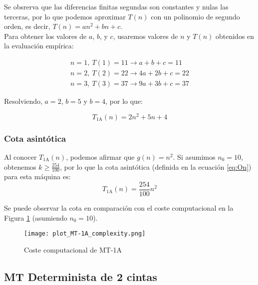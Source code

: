 Se obsrerva que las diferencias finitas segundas son constantes y nulas las terceras, por lo que podemos aproximar $T(n)$ con un polinomio de segundo orden, es decir, $T(n) = an^2 + bn + c$.\\

Para obtener los valores de $a$, $b$, y $c$, usaremos valores de $n$ y $T(n)$ obtenidos en la evaluación empírica:

\begin{subequations}
    \begin{gather}
        n = 1,\ T(1) = 11 \rightarrow a + b + c = 11 \\
        n = 2,\ T(2) = 22 \rightarrow 4a + 2b + c = 22 \\
        n = 3,\ T(3) = 37 \rightarrow 9a + 3b + c = 37
    \end{gather}
\end{subequations}

Resolviendo, $a=2$, $b=5$ y $b=4$, por lo que:

\begin{equation}
    T_{\mathrm{1A}}(n) = 2n^2 + 5n + 4
\end{equation}

\subsubsection*{Cota asintótica}
Al conocer $T_{\mathrm{1A}}(n)$, podemos afirmar que $g(n) = n^2$. Si asumimos $n_0 = 10$, obtenemos $k \geq \frac{254}{100}$, por lo que la cota asintótica (definida en la ecuación \ref{eq:On}) para esta máquina es:
\begin{equation}
    T_{\mathrm{1A}}(n) = \frac{254}{100} n^2
\end{equation}


Se puede observar la cota en comparación con el coste computacional en la Figura \ref{fig:MT-1A_plot} (asumiendo $n_0 = 10$).

\begin{figure}[h]
    \centering
    \texttt{[image: plot\_MT-1A\_complexity.png]}
    \caption{Coste computacional de MT-1A}
    \label{fig:MT-1A_plot}
\end{figure}



\subsection{MT Determinista de 2 cintas}

